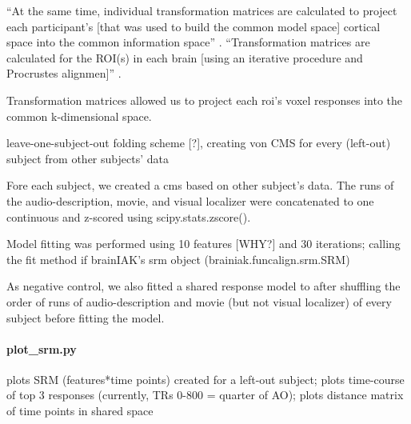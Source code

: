``At the same time, individual transformation matrices are calculated to project
each participant's [that was used to build the common model space] cortical
space into the common information space'' \citep{jiahui2020predicting}.
%
``Transformation matrices are calculated for the ROI(s) in each brain [using an
iterative procedure and Procrustes alignmen]'' \citep{jiahui2020predicting}.

Transformation matrices allowed us to project each \ac{roi}'s voxel responses into
the common k-dimensional space.




leave-one-subject-out folding scheme [?], creating von CMS for every (left-out)
subject from other subjects' data

Fore each subject, we created a \ac{cms} based on other subject's data.
%
The runs of the audio-description, movie, and visual localizer were concatenated
to one continuous and z-scored using scipy.stats.zscore().

Model fitting was performed using 10 features [WHY?] and 30 iterations; calling
the fit method if brainIAK's srm object (brainiak.funcalign.srm.SRM)

As negative control, we also fitted a shared response model to after shuffling
the order of runs of audio-description and movie (but not visual localizer) of
every subject before fitting the model.

\paragraph{plot\_srm.py}

%
plots SRM (features*time points) created for a left-out subject; plots
time-course of top 3 responses (currently, TRs 0-800 = quarter of AO); plots
distance matrix of time points in shared space


